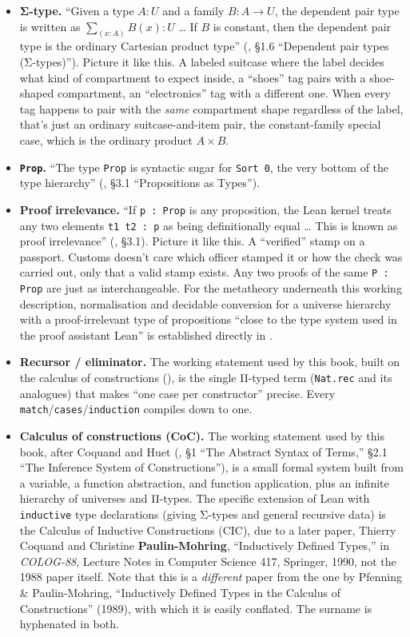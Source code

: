 \begin{itemize}
\tightlist
\item
  \textbf{Σ-type.} ``Given a type \(A : U\) and a family \(B : A \to U\), the dependent pair type is written as \(\sum_{(x:A)} B(x) : U\) \ldots{} If \(B\) is constant, then the dependent pair type is the ordinary Cartesian product type'' (\cite{HoTT2013}, §1.6 ``Dependent pair types (Σ-types)''). Picture it like this. A labeled suitcase where the label decides what kind of compartment to expect inside, a ``shoes'' tag pairs with a shoe-shaped compartment, an ``electronics'' tag with a different one. When every tag happens to pair with the \emph{same} compartment shape regardless of the label, that's just an ordinary suitcase-and-item pair, the constant-family special case, which is the ordinary product \(A \times B\).
\item
  \textbf{\texttt{Prop}.} ``The type \texttt{Prop} is syntactic sugar for \texttt{Sort 0}, the very bottom of the type hierarchy'' (\cite{TPIL4}, §3.1 ``Propositions as Types'').
\item
  \textbf{Proof irrelevance.} ``If \texttt{p : Prop} is any proposition, the Lean kernel treats any two elements \texttt{t1 t2 : p} as being definitionally equal \ldots{} This is known as proof irrelevance'' (\cite{TPIL4}, §3.1). Picture it like this. A ``verified'' stamp on a passport. Customs doesn't care which officer stamped it or how the check was carried out, only that a valid stamp exists. Any two proofs of the same \texttt{P : Prop} are just as interchangeable. For the metatheory underneath this working description, normalisation and decidable conversion for a universe hierarchy with a proof-irrelevant type of propositions ``close to the type system used in the proof assistant Lean'' is established directly in \cite{Coquand2021}.
\item
  \textbf{Recursor / eliminator.} The working statement used by this book, built on the calculus of constructions (\cite{CoquandHuet1988}), is the single Π-typed term (\texttt{Nat.rec} and its analogues) that makes ``one case per constructor'' precise. Every \texttt{match}/\texttt{cases}/\texttt{induction} compiles down to one.
\item
  \textbf{Calculus of constructions (CoC).} The working statement used by this book, after Coquand and Huet (\cite{CoquandHuet1988}, §1 ``The Abstract Syntax of Terms,'' §2.1 ``The Inference System of Constructions''), is a small formal system built from a variable, a function abstraction, and function application, plus an infinite hierarchy of universes and Π-types. The specific extension of Lean with \texttt{inductive} type declarations (giving Σ-types and general recursive data) is the Calculus of Inductive Constructions (CIC), due to a later paper, Thierry Coquand and Christine \textbf{Paulin-Mohring}, ``Inductively Defined Types,'' in \emph{COLOG-88}, Lecture Notes in Computer Science 417, Springer, 1990, not the 1988 paper itself. Note that this is a \emph{different} paper from the one by Pfenning \& Paulin-Mohring, ``Inductively Defined Types in the Calculus of Constructions'' (1989), with which it is easily conflated. The surname is hyphenated in both.

\end{itemize}
